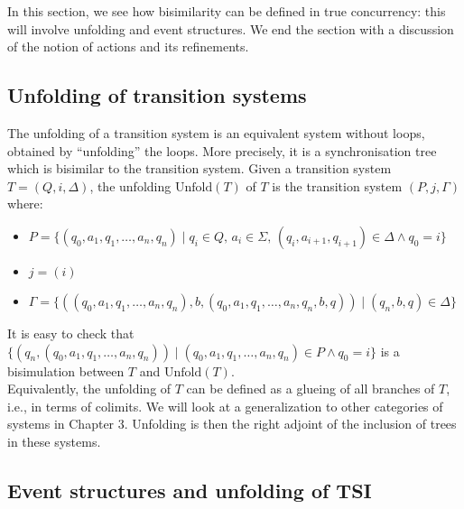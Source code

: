 In this section, we see how bisimilarity can be defined in true concurrency: this will involve unfolding and event structures. We end the section with a discussion of the notion of actions and its refinements.

	\subsection{Unfolding of transition systems}
	
	The unfolding of a transition system is an equivalent system without loops, obtained by ``unfolding'' the loops. More precisely, it is a synchronisation tree which is bisimilar to the transition system. Given a transition system $T = (Q,i,\Delta)$, the unfolding $\mathrm{Unfold}(T)$ of $T$ is the transition system $(P, j, \Gamma)$ where:
\begin{itemize}
	\item $P = \{(q_0, a_1, q_1, \ldots, a_n, q_n)\mid q_i \in Q, \, a_i \in \Sigma, \, (q_i, a_{i+1}, q_{i+1}) \in \Delta \wedge q_0 = i\}$
	\item $j = (i)$
	\item $\Gamma = \{((q_0, a_1, q_1, \ldots, a_n, q_n),b,(q_0, a_1, q_1, \ldots, a_n, q_n,b,q))\mid (q_n,b,q) \in \Delta\}$
\end{itemize}
It is easy to check that $\{(q_n,(q_0, a_1, q_1, \ldots, a_n, q_n)) \mid (q_0, a_1, q_1, \ldots, a_n, q_n) \in P\wedge q_0 = i\}$ is a bisimulation between $T$ and $\mathrm{Unfold}(T)$.\\
Equivalently, the unfolding of $T$ can be defined as a glueing of all branches of $T$, i.e., in terms of colimits. We will look at a generalization to other categories of systems in Chapter 3. Unfolding is then the right adjoint of the inclusion of trees in these systems.

	\subsection{Event structures and unfolding of TSI}

